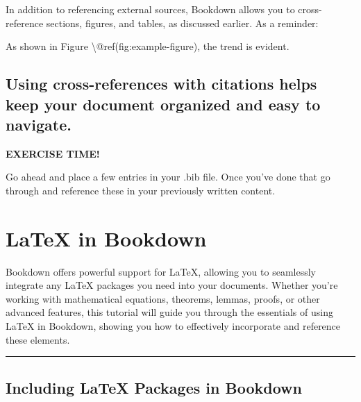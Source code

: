 \documentclass[
]{book}
\newenvironment{Shaded}{\begin{snugshade}}{\end{snugshade}}
\newcommand{\NormalTok}[1]{#1}
\newenvironment{blackbox}{
  \definecolor{shadecolor}{rgb}{0, 0, 0}
  \color{white}
  \begin{shaded}
  }
 {\end{shaded}}
\theoremstyle{definition}
\theoremstyle{definition}
\theoremstyle{definition}
\theoremstyle{definition}
\theoremstyle{remark}
\begin{document}
In addition to referencing external sources, Bookdown allows you to cross-reference sections, figures, and tables, as discussed earlier. As a reminder:

\begin{Shaded}
\begin{Highlighting}[]
\NormalTok{As shown in Figure \textbackslash{}@ref(fig:example{-}figure), the trend is evident.}
\end{Highlighting}
\end{Shaded}

\section{Using cross-references with citations helps keep your document organized and easy to navigate.}\label{using-cross-references-with-citations-helps-keep-your-document-organized-and-easy-to-navigate.}

\begin{blackbox}

\begin{center}
\textbf{EXERCISE TIME!}

\end{center}

Go ahead and place a few entries in your .bib file. Once you've done that go through and reference these in your previously written content.

\end{blackbox}

\chapter{LaTeX in Bookdown}\label{chapter5}

Bookdown offers powerful support for LaTeX, allowing you to seamlessly integrate any LaTeX packages you need into your documents. Whether you're working with mathematical equations, theorems, lemmas, proofs, or other advanced features, this tutorial will guide you through the essentials of using LaTeX in Bookdown, showing you how to effectively incorporate and reference these elements.

\begin{center}\rule{0.5\linewidth}{0.5pt}\end{center}

\section{Including LaTeX Packages in Bookdown}\label{including-latex-packages-in-bookdown}
\end{document}

